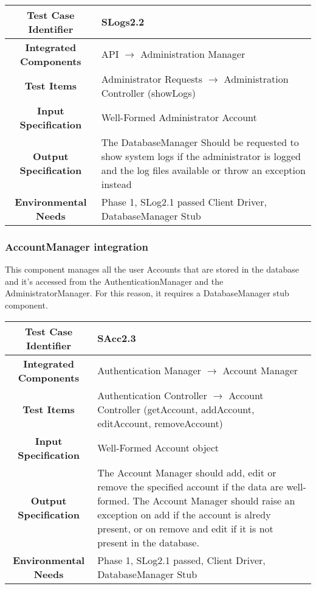 \documentclass[11pt, a4paper,titlepage]{article}
\begin{document}
		  \subsubsection{}
		  \begin{tabularx}{\textwidth}{| c|X|}
		  	\hline \textbf{Test Case Identifier} & \label{SLogs2.2}SLogs2.2 \\
		  	\hline \textbf{Integrated Components} &  API $\rightarrow $ Administration Manager \\
		  	\hline \textbf{Test Items} &  Administrator Requests  $\rightarrow $ Administration Controller (showLogs)\\
		  	\hline \textbf{Input Specification} &  Well-Formed Administrator Account\\
		  	\hline \textbf{Output Specification} & The DatabaseManager Should be requested to show system logs if the administrator is logged and the log files available or throw an exception instead\\
		  	\hline \textbf{Environmental Needs} &  Phase 1, SLog2.1 passed \newline 
		  	Client Driver, DatabaseManager Stub\\
		  	\hline
		  \end{tabularx}
		  \newline
		 \newpage
		\subsubsection{AccountManager integration}
		This component manages all the user Accounts that are stored in the database and it's accessed from the AuthenticationManager and the AdministratorManager. For this reason, it requires a DatabaseManager stub component.
		
		 \begin{tabularx}{\textwidth}{| c|X|}
		 	\hline \textbf{Test Case Identifier} & \label{SAcc2.3}SAcc2.3 \\
		 	\hline \textbf{Integrated Components} &  Authentication Manager $\rightarrow $ Account Manager \\
		 	\hline \textbf{Test Items} &  Authentication Controller  $\rightarrow $ Account Controller (getAccount, addAccount, editAccount, removeAccount)\\
		 	\hline \textbf{Input Specification} &  Well-Formed Account object\\
		 	\hline \textbf{Output Specification} & The Account Manager should add, edit or remove the specified account if the data are well-formed. \newline The Account Manager should raise an exception on add if the account is alredy present, or on remove and edit if it is not present in the database.\\
		 	\hline \textbf{Environmental Needs} &  Phase 1, SLog2.1 passed, \newline 
		 	Client Driver, DatabaseManager Stub\\
		 	\hline
		 \end{tabularx}
		 \newline
\end{document}
